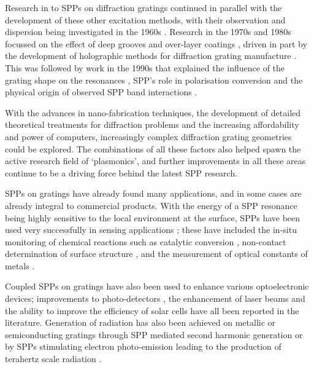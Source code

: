 Research in to SPPs on diffraction gratings continued in parallel with the development of these other excitation methods, with their observation and dispersion being investigated in the 1960s \cite{Stewart1962,Hagglund1966,Ritchie1968}. Research in the 1970s and 1980s focussed on the effect of deep grooves \cite{Inagaki:86,Maradudin1982,Laks1981,Ly1981} and over-layer coatings \cite{Introduction1970,Chandezon1982}, driven in part by the development of holographic methods for diffraction grating manufacture \cite{Palmer2005}. This was followed by work in the 1990s that explained the influence of the grating shape on the resonances \cite{Watts1999}, SPP's role in polarisation conversion \cite{Bryan-Brown1990} and the physical origin of observed SPP band interactions \cite{Barnes1995}. 

With the advances in nano-fabrication techniques, the development of detailed theoretical treatments for diffraction problems \cite{Bao} and the increasing affordability and power of computers, increasingly complex diffraction grating geometries could be explored. The combinations of all these factors also helped spawn the active research field of `plasmonics', and further improvements in all these areas continue to be a driving force behind the latest SPP research. 

SPPs on gratings have already found many applications, and in some cases are already integral to commercial products. With the energy of a SPP resonance being  highly sensitive to the local environment at the surface, SPPs have been used very successfully in sensing applications  \cite{Tu1999,Bog2012,Singh2006}; these have included the in-situ monitoring of chemical reactions such as catalytic conversion \cite{Janssens2007,Lindfors2004},
non-contact determination of surface structure \cite{Watts1998, T.Hallam2000}, and the measurement of optical constants of metals \cite{Watts1996}. 

Coupled SPPs on gratings have also been used to enhance various optoelectronic devices; improvements to photo-detectors \cite{Butun2012}, the enhancement of laser beams \cite{Oulton2009,H'Dhili2011,Okamoto2008,Berini2011}
and the ability to improve the efficiency of solar cells \cite{Polman2012,Ferry2011,VandeGroep2012,VanLare2012,Sha2012}   have all been reported in the literature. Generation of radiation has also been achieved on metallic or semiconducting gratings through SPP mediated second harmonic generation \cite{Zayats2005} or by SPPs stimulating electron photo-emission leading to the production of terahertz scale radiation \cite{Welsh2007, Shubina2011a}. 

